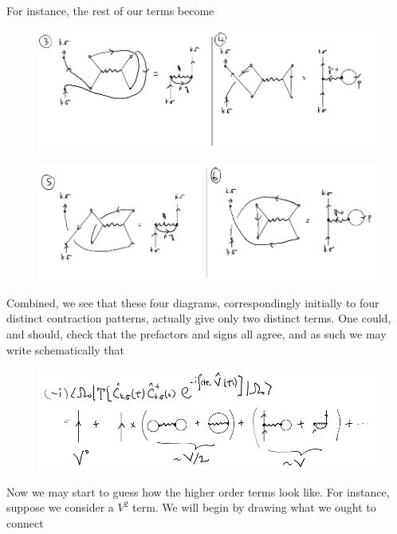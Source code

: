For instance, the rest of our terms become

\begin{figure}[H]
    \centering
    \includegraphics[width=\textwidth]{jupyterbook/data/fig/lec17-fig03.png}
\end{figure}

\begin{figure}[H]
    \centering
    \includegraphics[width=\textwidth]{jupyterbook/data/fig/lec17-fig04.png}
\end{figure}

Combined, we see that these four diagrams, correspondingly initially to four distinct contraction patterns, actually give only two distinct terms. One could, and should, check that the prefactors and signs all agree, and as such we may write schematically that

\begin{figure}[H]
    \centering
    \includegraphics[width=\textwidth]{jupyterbook/data/fig/lec17-fig05.png}
\end{figure}

Now we may start to guess how the higher order terms look like. For instance, suppose we consider a $V^2$ term. We will begin by drawing what we ought to connect

